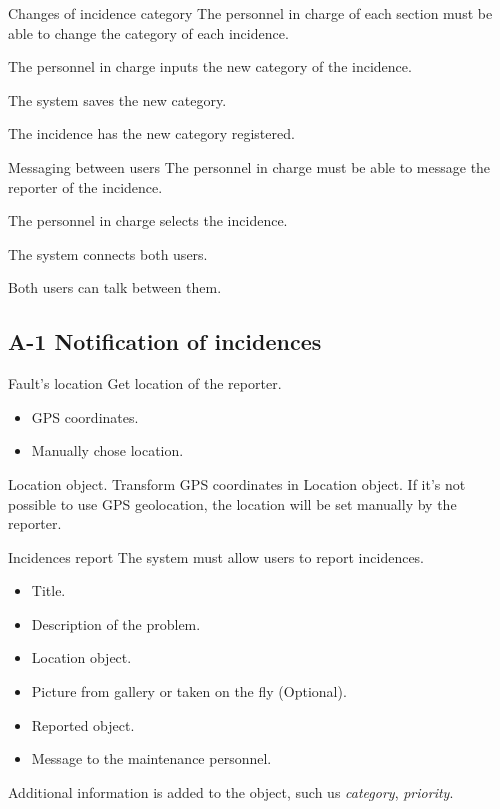 \begin{requirement}{Changes of incidence category}
\reqdesc The personnel in charge of each section must be able to change the category of each incidence.

\reqin The personnel in charge inputs the new category of the incidence.

\reqsteps The system saves the new category.

\reqout The incidence has the new category registered.
\end{requirement}


\begin{requirement}{Messaging between users}
\reqdesc The personnel in charge must be able to message the reporter of the incidence.

\reqin The personnel in charge selects the incidence.

\reqsteps The system connects both users.

\reqout Both users can talk between them.
\end{requirement}


\subsection{A-1 Notification of incidences}

\begin{requirement}{Fault's location}
\reqdesc Get location of the reporter.
\reqin
\begin{itemize}
\item GPS coordinates.
\item Manually chose location.
\end{itemize}
\reqout Location object.
\reqsteps Transform GPS coordinates in Location object. If it's not possible to use GPS geolocation, the location will be set manually by the reporter.
\end{requirement}

\begin{requirement}{Incidences report}
\reqdesc The system must allow users to report incidences.
\reqin 
\begin{itemize}
	\item Title.
	\item Description of the problem.
	\item Location object.
	\item Picture from gallery or taken on the fly (Optional).
\end{itemize}
\reqout 

\begin{itemize}
	\item Reported object.
	\item Message to the maintenance personnel.
\end{itemize}
\reqsteps Additional information is added to the object, such us \textit{category}, \textit{priority}.
\end{requirement}

